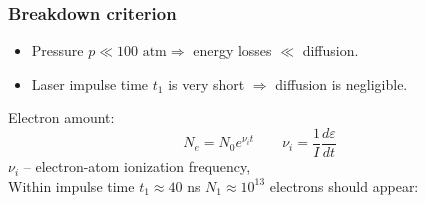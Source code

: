 \documentclass{beamer}
\begin{document}
	\begin{frame}
		\frametitle{Breakdown criterion}
		\begin{itemize}
			\item Pressure $p \ll 100 \text{ atm} \Rightarrow$ energy losses $\ll$ diffusion.
			\item Laser impulse time $t_1$ is very short $\Rightarrow$ diffusion is negligible.
			
		\end{itemize}
		
		
		Electron amount:
		$$ N_e = N_0 e^{\nu_i t} \qquad \nu_i = \frac{1}{I} \frac{d\varepsilon}{dt}$$
		$\nu_i$ -- electron-atom ionization frequency,\\
		
		Within impulse time $t_1 \approx 40$ ns $N_1 \approx 10^{13}$ electrons should appear:
		
		\begin{center}
		\end{center}

	\end{frame}
\end{document}

